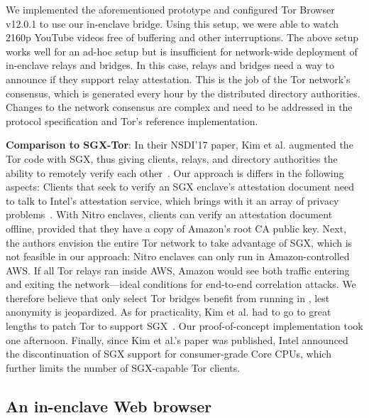 We implemented the aforementioned prototype and configured Tor Browser v12.0.1
to use our in-enclave bridge.  Using this setup, we were able to watch 2160p
YouTube videos free of buffering and other interruptions.
%
The above setup works well for an ad-hoc setup but is insufficient for
network-wide deployment of in-enclave relays and bridges.  In this case, relays
and bridges need a way to announce if they support relay attestation.  This is
the job of the Tor network's consensus, which is generated every hour by the
distributed directory authorities.  Changes to the network consensus are
complex and need to be addressed in the protocol specification and Tor's
reference implementation.

\textbf{Comparison to SGX-Tor}:
In their NSDI'17 paper, Kim et al. augmented the Tor code with SGX, thus giving
clients, relays, and directory authorities the ability to remotely verify each
other~\cite{Kim2017a}.  Our approach is differs in the following
aspects:
%
Clients that seek to verify an SGX enclave's attestation document need to talk
to Intel's attestation service, which brings with it an array of privacy
problems~\cite[\S~1.2]{Chen2019a}.  With Nitro enclaves, clients can verify an
attestation document offline, provided that they have a copy of Amazon's root CA
public key.
Next, the authors envision the entire Tor network to take advantage of SGX,
which is not feasible in our approach: Nitro enclaves can only run in
Amazon-controlled AWS.  If all Tor relays ran inside AWS, Amazon would see both
traffic entering and exiting the network---ideal conditions for end-to-end
correlation attacks.  We therefore believe that only select Tor bridges benefit
from running in \tool{}, lest anonymity is jeopardized.
As for practicality, Kim et al. had to go to great lengths to patch Tor to
support SGX~\cite[\S~5]{Kim2017a}.  Our proof-of-concept implementation took
one afternoon.  Finally, since Kim et al.'s paper was published, Intel
announced the discontinuation of SGX support for consumer-grade Core CPUs,
which further limits the number of SGX-capable Tor clients.

\subsection{An in-enclave Web browser}%
\label{sec:browser}

